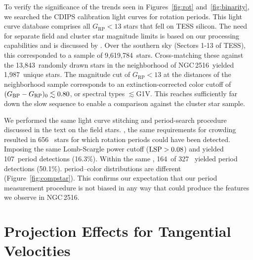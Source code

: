 \documentclass[12pt,twocolumn,tighten]{aastex63}
\newcommand{\cn}{NGC\,2516} %
\newcommand{\nnbhd}{13{,}843} %
\newcommand{\ncalibration}{9{,}619{,}784} %
\newcommand{\nnbhdcalibstar}{1{,}987} %
\newcommand{\ncompstardenominator}{656} %
\newcommand{\ncompstarnumerator}{107} %
\newcommand{\ncompfrac}{16.3\%} %
\newcommand{\nautovscompstardenominator}{327} %
\newcommand{\nautovscompstarnumerator}{164} %
\newcommand{\nautofrac}{50.1\%} %
\newcommand{\bpmrpo}{(G_{\rm BP}-G_{\rm RP})_0}
\begin{document}
To verify the significance of the trends seen in Figures~\ref{fig:rot}
and~\ref{fig:binarity}, we searched the CDIPS calibration light curves
for rotation periods.  This light curve database comprises all $G_\mathrm{RP}<13$
stars that fell on TESS silicon. The need for separate field and
cluster star magnitude limits is based on our processing capabilities and is discussed
by \citet{bouma_cdipsI_2019}.  Over the southern sky (Sectors 1-13 of
TESS), this corresponded to a sample of \ncalibration\ stars.
Cross-matching these against the \nnbhd\ randomly drawn stars in the
neighborhood of \cn\ yielded \nnbhdcalibstar\ unique stars.  The
magnitude cut of $G_\mathrm{RP}<13$ at the distances of the neighborhood sample
corresponds to an extinction-corrected color cutoff of $\bpmrpo
\lesssim 0.80$, or spectral types $\lesssim$G1V.  This reaches
sufficiently far down the slow sequence to enable a comparison against
the cluster star sample.


We performed the same light curve stitching and period-search
procedure discussed in the text on the field stars.
\replaced{Imposing}{Within $0.4<\bpmrpo<0.8$}, the same requirements
for crowding resulted in \ncompstardenominator\  stars
for which rotation periods could have been detected.  Imposing the
same Lomb-Scargle power cutoff (${\rm LSP}>0.08$) and  yielded \ncompstarnumerator\ period
detections (\ncompfrac).  Within the same , \nautovscompstarnumerator\ of
\nautovscompstardenominator\  yielded period detections
(\nautofrac).  period--color distributions
are  different (Figure~\ref{fig:compstar}).  This confirms our
expectation that our period measurement procedure is not biased in any
way that could produce the features we observe in \cn.


\section{Projection Effects for Tangential Velocities}
\label{app:vproj}
\end{document}
